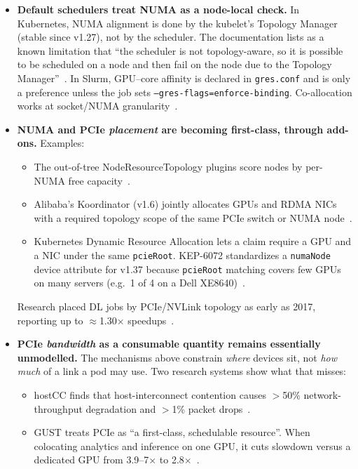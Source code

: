 \begin{itemize}
  \item \textbf{Default schedulers treat NUMA as a node-local check.} In Kubernetes, NUMA alignment is done by the kubelet's Topology Manager (stable since v1.27), not by the scheduler. The documentation lists as a known limitation that ``the scheduler is not topology-aware, so it is possible to be scheduled on a node and then fail on the node due to the Topology Manager''~\cite{k8s2026topomgr}. In Slurm, GPU--core affinity is declared in \texttt{gres.conf} and is only a preference unless the job sets \texttt{--gres-flags=enforce-binding}. Co-allocation works at socket/NUMA granularity~\cite{slurm2026gres}.
  \item \textbf{NUMA and PCIe \emph{placement} are becoming first-class, through add-ons.} Examples:
  \begin{itemize}
    \item The out-of-tree NodeResourceTopology plugins score nodes by per-NUMA free capacity~\cite{k8s2026nrt}.
    \item Alibaba's Koordinator (v1.6) jointly allocates GPUs and RDMA NICs with a required topology scope of the same PCIe switch or NUMA node~\cite{koordinator2025v16}.
    \item Kubernetes Dynamic Resource Allocation lets a claim require a GPU and a NIC under the same \texttt{pcieRoot}. KEP-6072 standardizes a \texttt{numaNode} device attribute for v1.37 because \texttt{pcieRoot} matching covers few GPUs on many servers (e.g.\ 1 of 4 on a Dell XE8640)~\cite{k8s2026kep6072}.
  \end{itemize}
  Research placed DL jobs by PCIe/NVLink topology as early as 2017, reporting up to $\approx$1.30$\times$ speedups~\cite{amaral2017topology}.
  \item \textbf{PCIe \emph{bandwidth} as a consumable quantity remains essentially unmodelled.} The mechanisms above constrain \emph{where} devices sit, not \emph{how much} of a link a pod may use. Two research systems show what that misses:
  \begin{itemize}
    \item hostCC finds that host-interconnect contention causes $>$50\% network-throughput degradation and $>$1\% packet drops~\cite{agarwal2023hostcc}.
    \item GUST treats PCIe as ``a first-class, schedulable resource''. When colocating analytics and inference on one GPU, it cuts slowdown versus a dedicated GPU from 3.9--7$\times$ to 2.8$\times$~\cite{jiang2026gust}.
  \end{itemize}
\end{itemize}

